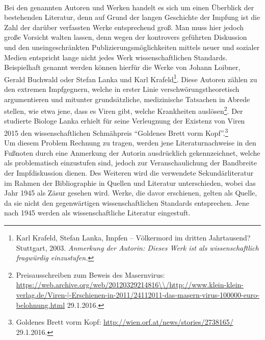 \documentclass[
    a4paper,
    12pt,
    hyphens,
    chapterprefix=true,
    headheight=33pt,
    footheight=29pt,
    headings=optiontohead,
]{scrartcl}
\begin{document}
\\
Bei den genannten Autoren und Werken handelt es sich um einen Überblick der bestehenden Literatur, denn auf Grund der langen Geschichte der Impfung ist die Zahl der darüber verfassten Werke entsprechend groß. Man muss hier jedoch große Vorsicht walten lassen, denn wegen der kontrovers geführten Diskussion und den uneingeschränkten Publizierungsmöglichkeiten mittels neuer und sozialer Medien entspricht lange nicht jedes Werk wissenschaftlichen Standards. Beispielhaft genannt werden können hierfür die Werke von Johann Loibner, Gerald Buchwald oder Stefan Lanka und Karl Krafeld\footnote{Karl Krafeld, Stefan Lanka, Impfen -- Völkermord im dritten Jahrtausend? Stuttgart, 2003. \textit{Anmerkung der Autorin: Dieses Werk ist als wissenschaftlich fragwürdig einzustufen.}}. Diese Autoren zählen zu den extremen Impfgegnern, welche in erster Linie verschwörungstheoretisch argumentieren und mitunter grundsätzliche, medizinische Tatsachen in Abrede stellen, wie etwa jene, dass es Viren gibt, welche Krankheiten auslösen\footnote{Preisausschreiben zum Beweis des Masernvirus: \url{https://web.archive.org/web/20120329214816\\/http://www.klein-klein-verlag.de/Viren-|-Erschienen-in-2011/24112011-das-masern-virus-100000-euro-belohnung.html} 29.1.2016.}. Der studierte Biologe Lanka erhielt für seine Verleugnung der Existenz von Viren 2015 den wissenschaftlichen Schmähpreis "`Goldenes Brett vorm Kopf"'.\footnote{Goldenes Brett vorm Kopf: \url{http://wien.orf.at/news/stories/2738165/} 29.1.2016.}\\
Um diesem Problem Rechnung zu tragen, werden jene Literaturnachweise in den Fußnoten durch eine Anmerkung der Autorin ausdrücklich gekennzeichnet, welche als problematisch einzustufen sind, jedoch zur Veranschaulichung der Bandbreite der Impfdiskussion dienen. Des Weiteren wird die verwendete Sekundärliteratur im Rahmen der Bibliographie in Quellen und Literatur unterschieden, wobei das Jahr 1945 als Zäsur gesehen wird. Werke, die davor erschienen, gelten als Quelle, da sie nicht den gegenwärtigen wissenschaftlichen Standards entsprechen. Jene nach 1945 werden als wissenschaftliche Literatur eingestuft.\\
\end{document}
